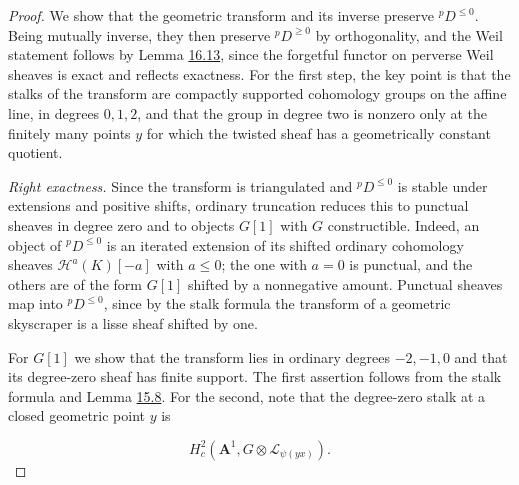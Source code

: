 \documentclass[11pt]{article}
\begin{document}
\begin{proof}[{Proof}]\label{bp215}%
We show that the geometric transform and its inverse preserve \({}^pD^{\le0}\). Being mutually inverse, they then preserve \({}^pD^{\ge0}\) by orthogonality, and the Weil statement follows by Lemma \hyperref[bp206]{16.13}, since the forgetful functor on perverse Weil sheaves is exact and reflects exactness. For the first step, the key point is that the stalks of the transform are compactly supported cohomology groups on the affine line, in degrees \(0,1,2\), and that the group in degree two is nonzero only at the finitely many points \(y\) for which the twisted sheaf has a geometrically constant quotient.

\emph{Right exactness.} Since the transform is triangulated and \({}^pD^{\le0}\) is stable under extensions and positive shifts, ordinary truncation reduces this to punctual sheaves in degree zero and to objects \(G[1]\) with \(G\) constructible. Indeed, an object of \({}^pD^{\le0}\) is an iterated extension of its shifted ordinary cohomology sheaves \(\mathcal H^a(K)[-a]\) with \(a\le0\); the one with \(a=0\) is punctual, and the others are of the form \(G[1]\) shifted by a nonnegative amount. Punctual sheaves map into \({}^pD^{\le0}\), since by the stalk formula the transform of a geometric skyscraper is a lisse sheaf shifted by one.

For \(G[1]\) we show that the transform lies in ordinary degrees \(-2,-1,0\) and that its degree-zero sheaf has finite support. The first assertion follows from the stalk formula and Lemma \hyperref[bp143]{15.8}. For the second, note that the degree-zero stalk at a closed geometric point \(y\) is

\[
H_c^2(\mathbf A^1,G\otimes\mathcal L_{\psi(yx)}).
\]


\end{proof}
\end{document}
